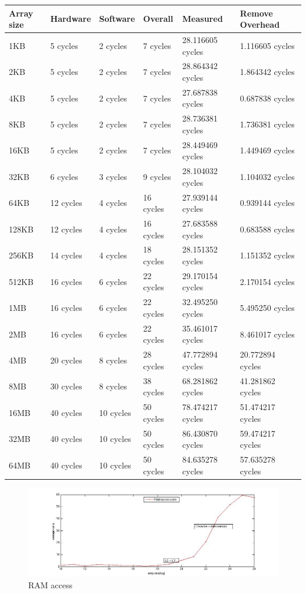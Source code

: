 \begin{center}
\begin{tabular}{| p{1cm} | p{2cm} | p{2cm} | p{2cm} | p{3cm} | p{3cm} |}
Array size              & Hardware  & Software  & Overall  & Measured  & Remove Overhead \\
\hline
1KB & 5 cycles& 2 cycles& 7 cycles& 28.116605 cycles& 1.116605 cycles\\
2KB & 5 cycles& 2 cycles& 7 cycles& 28.864342 cycles&  1.864342 cycles\\
4KB & 5 cycles& 2 cycles& 7 cycles& 27.687838  cycles& 0.687838 cycles\\
8KB & 5 cycles& 2 cycles& 7 cycles& 28.736381 cycles & 1.736381 cycles\\
16KB & 5 cycles& 2 cycles& 7 cycles& 28.449469 cycles & 1.449469 cycles\\
32KB & 6 cycles& 3 cycles& 9 cycles& 28.104032  cycles& 1.104032 cycles\\
64KB & 12 cycles& 4 cycles& 16 cycles& 27.939144 cycles&  0.939144 cycles\\
128KB & 12 cycles& 4 cycles& 16 cycles& 27.683588 cycles&  0.683588 cycles\\
256KB & 14 cycles& 4 cycles& 18 cycles& 28.151352 cycles&  1.151352 cycles\\
512KB & 16 cycles& 6 cycles& 22 cycles& 29.170154  cycles& 2.170154 cycles\\
1MB & 16 cycles& 6 cycles& 22 cycles& 32.495250  cycles& 5.495250 cycles\\
2MB & 16 cycles& 6 cycles& 22 cycles& 35.461017 cycles& 8.461017 cycles\\
4MB & 20 cycles& 8 cycles& 28 cycles& 47.772894  cycles& 20.772894 cycles\\
8MB & 30 cycles& 8 cycles& 38 cycles& 68.281862  cycles& 41.281862 cycles\\
16MB & 40 cycles& 10 cycles& 50 cycles& 78.474217 cycles& 51.474217 cycles\\
32MB & 40 cycles& 10 cycles& 50 cycles& 86.430870 cycles& 59.474217 cycles\\
64MB & 40 cycles& 10 cycles& 50 cycles& 84.635278 cycles& 57.635278 cycles\\
\end{tabular}
\end{center}

\begin{figure}[htbp] %
   \centering
   \includegraphics[width=6in]{./pics/ramacc.jpg} 
   \caption{RAM access}
   \label{fig:RAM access}
\end{figure}

